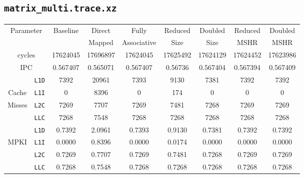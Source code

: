 \documentclass[11pt, swedish, openany]{book}
\begin{document}
\subsection{\texttt{matrix\_multi.trace.xz}}
\begin{table}[H]
    \begin{tabular}{||c|c||c||c|c||c|c||c|c||}
        \hline
        \multicolumn{2}{||c||}{\multirow{2}{*}{Parameter}} & \multirow{2}{*}{Baseline} & Direct   & Fully       & Reduced  & Doubled  & Reduced  & Doubled  \\
        \multicolumn{2}{||c||}{}                           &                           & Mapped   & Associative & Size     & Size     & MSHR     & MSHR     \\
        \hline
        \multicolumn{2}{||c||}{cycles}                     & 17624045                  & 17696897 & 17624045    & 17625492 & 17624129 & 17624452 & 17623986 \\
        \multicolumn{2}{||c||}{IPC}                        & 0.567407                  & 0.565071 & 0.567407    & 0.56736  & 0.567404 & 0.567394 & 0.567409 \\
        \hline
                                            & \texttt{L1D} & 7392                      & 20961    & 7393        & 9130     & 7381     & 7392     & 7392     \\
        Cache                               & \texttt{L1I} & 0                         & 8396     & 0           & 174      & 0        & 0        & 0        \\
        Misses                              & \texttt{L2C} & 7269                      & 7707     & 7269        & 7481     & 7268     & 7269     & 7269     \\
                                            & \texttt{LLC} & 7268                      & 7548     & 7268        & 7268     & 7268     & 7268     & 7268     \\
        \hline
                                            & \texttt{L1D} & 0.7392                    & 2.0961   & 0.7393      & 0.9130   & 0.7381   & 0.7392   & 0.7392   \\
        \multirow{2}{*}{MPKI}               & \texttt{L1I} & 0.0000                    & 0.8396   & 0.0000      & 0.0174   & 0.0000   & 0.0000   & 0.0000   \\
                                            & \texttt{L2C} & 0.7269                    & 0.7707   & 0.7269      & 0.7481   & 0.7268   & 0.7269   & 0.7269   \\
                                            & \texttt{LLC} & 0.7268                    & 0.7548   & 0.7268      & 0.7268   & 0.7268   & 0.7268   & 0.7268   \\

\end{tabular}
\end{table}
\end{document}
